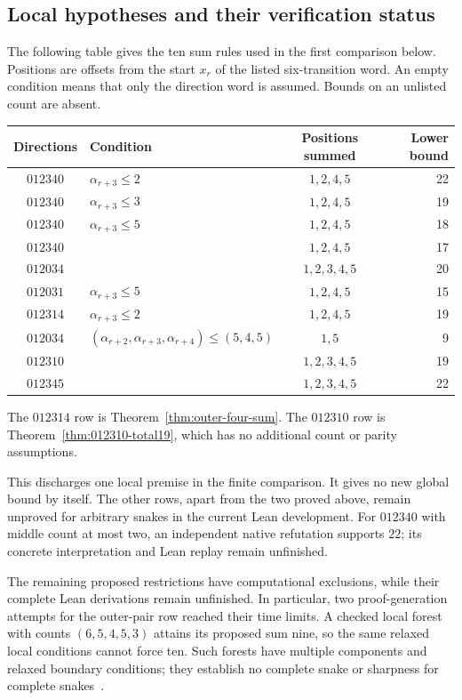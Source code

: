 \documentclass[11pt,a4paper]{article}
\theoremstyle{definition}
\theoremstyle{remark}
\begin{document}
\subsection{Local hypotheses and their verification status}
The following table gives the ten sum rules used in the first comparison below.
Positions are offsets from the start $x_r$ of the listed six-transition
word. An empty condition means that only the direction word is assumed.
Bounds on an unlisted count are absent.
\begin{center}\small
\begin{tabular}{c l c r}
\toprule
Directions & Condition & Positions summed & Lower bound\\\midrule
$012340$ & $\alpha_{r+3}\le2$ & $1,2,4,5$ & 22\\
$012340$ & $\alpha_{r+3}\le3$ & $1,2,4,5$ & 19\\
$012340$ & $\alpha_{r+3}\le5$ & $1,2,4,5$ & 18\\
$012340$ & & $1,2,4,5$ & 17\\
$012034$ & & $1,2,3,4,5$ & 20\\
$012031$ & $\alpha_{r+3}\le5$ & $1,2,4,5$ & 15\\
$012314$ & $\alpha_{r+3}\le2$ & $1,2,4,5$ & 19\\
$012034$ & $(\alpha_{r+2},\alpha_{r+3},\alpha_{r+4})\le(5,4,5)$ & $1,5$ & 9\\
$012310$ & & $1,2,3,4,5$ & 19\\
$012345$ & & $1,2,3,4,5$ & 22\\\bottomrule
\end{tabular}
\end{center}
The $012314$ row is Theorem~\ref{thm:outer-four-sum}. The $012310$ row is
Theorem~\ref{thm:012310-total19}, which has no additional count or parity assumptions.


This discharges one local premise in the finite comparison. It gives no
new global bound by itself. The other rows, apart from the two proved
above, remain unproved for arbitrary snakes in the current Lean development.
For $012340$ with middle count at most two, an independent native refutation
supports $22$; its concrete interpretation and Lean replay remain unfinished.

The remaining proposed restrictions have computational exclusions, while their
complete Lean derivations remain unfinished. In particular, two proof-generation
attempts for the outer-pair row reached their time limits. A checked local
forest with counts $(6,5,4,5,3)$ attains its proposed sum nine, so the same
relaxed local conditions cannot force ten. Such forests have multiple
components and relaxed boundary conditions; they establish no complete
snake or sharpness for complete snakes~\cite{pairbudgetarchive}.
\end{document}

